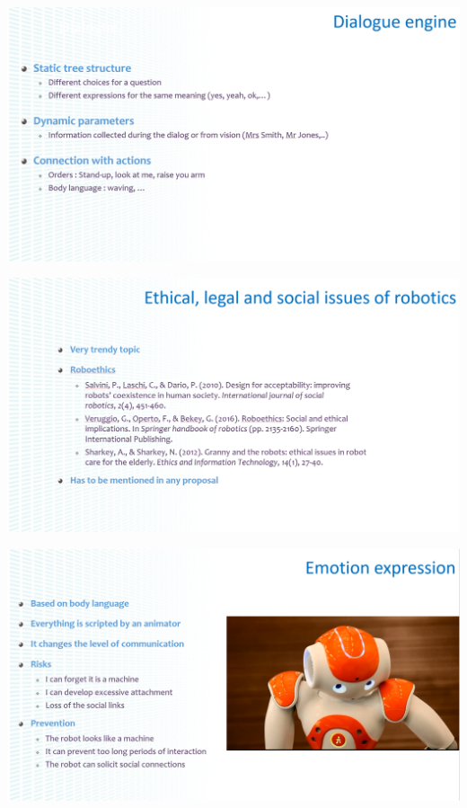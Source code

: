 \documentclass[xetex,mathserif,serif]{beamer}
\begin{document}
	\begin{frame}
		\begin{center}
			\includegraphics[width=\textwidth]{gelin18.png}
		\end{center}
	\end{frame}

	\begin{frame}
		\begin{center}
			\includegraphics[width=\textwidth]{gelin19.png}
		\end{center}
	\end{frame}

	\begin{frame}
		\begin{center}
			\includegraphics[width=\textwidth]{gelin20.png}
		\end{center}
	\end{frame}
\end{document}
